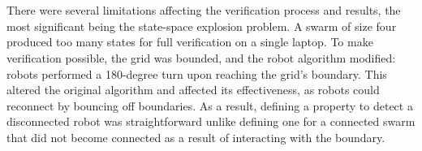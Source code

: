 \\\\
There were several limitations affecting the verification process and results, the most significant being the state-space explosion problem. A swarm of size four produced too many states for full verification on a single laptop. To make verification possible, the grid was bounded, and the robot algorithm modified: robots performed a 180-degree turn upon reaching the grid's boundary. This altered the original algorithm and affected its effectiveness, as robots could reconnect by bouncing off boundaries. As a result, defining a property to detect a disconnected robot was straightforward unlike defining one for a connected swarm that did not become connected as a result of interacting with the boundary.